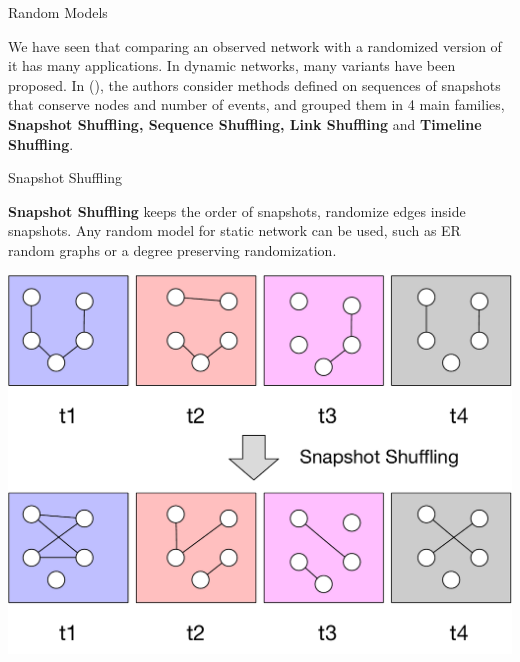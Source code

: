 \documentclass[a4paper,11pt]{book}
\begin{document}
\begin{textbox}{Random Models}

We have seen that comparing an observed network with a randomized version of it has many applications. In dynamic networks, many variants have been proposed. In (\cite{gauvin2022}), the authors consider methods defined on sequences of snapshots that conserve nodes and number of events, and grouped them in 4 main families, \textbf{Snapshot Shuffling, Sequence Shuffling, Link Shuffling} and \textbf{Timeline Shuffling}.

\end{textbox}




\begin{textbox}{Snapshot Shuffling}

 \textbf{Snapshot Shuffling} keeps the order of snapshots, randomize edges inside snapshots. Any random model for static network can be used, such as ER random graphs or a degree preserving randomization.
 
 
 
\centering
\colorbox{white}{\includegraphics[width=0.8\linewidth]{pics/dynamic/snapshot_shuffling.pdf}}
 
\end{textbox}
\end{document}
